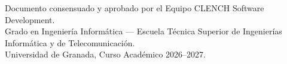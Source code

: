 \vfill
\begin{center}
  \small\sffamily\color{textGray}
  Documento consensuado y aprobado por el Equipo CLENCH Software Development.\\
  Grado en Ingeniería Informática --- Escuela Técnica Superior de Ingenierías Informática y de Telecomunicación.\\
  Universidad de Granada, Curso Académico 2026--2027.
\end{center}



